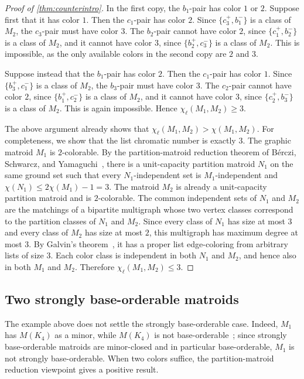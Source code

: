 \documentclass[10pt,a4paper]{article}
\theoremstyle{plain}
\theoremstyle{definition}
\begin{document}
\begin{proof}[Proof of \cref{thm:counterintro}]
In the first copy, the $b_1$-pair has color $1$ or $2$. Suppose first that it has color $1$. Then the $c_1$-pair has color $2$. Since $\{c_3^+,b_1^-\}$ is a class of $M_2$, the $c_3$-pair must have color $3$. The $b_2$-pair cannot have color $2$, since $\{c_1^+,b_2^-\}$ is a class of $M_2$, and it cannot have color $3$, since $\{b_2^+,c_3^-\}$ is a class of $M_2$. This is impossible, as the only available colors in the second copy are $2$ and $3$.

Suppose instead that the $b_1$-pair has color $2$. Then the $c_1$-pair has color $1$. Since $\{b_3^+,c_1^-\}$ is a class of $M_2$, the $b_3$-pair must have color $3$. The $c_2$-pair cannot have color $2$, since $\{b_1^+,c_2^-\}$ is a class of $M_2$, and it cannot have color $3$, since $\{c_2^+,b_3^-\}$ is a class of $M_2$. This is again impossible. Hence $\chi_\ell(M_1,M_2)\ge3$.

The above argument already shows that $\chi_\ell(M_1,M_2)>\chi(M_1,M_2)$. For completeness, we show that the list chromatic number is exactly $3$. The graphic matroid $M_1$ is $2$-colorable. By the partition-matroid reduction theorem of B\'erczi, Schwarcz, and Yamaguchi~\cite[Theorem~1.6]{berczi2021list}, there is a unit-capacity partition matroid $N_1$ on the same ground set such that every $N_1$-independent set is $M_1$-independent and $\chi(N_1)\le2\chi(M_1)-1=3$. The matroid $M_2$ is already a unit-capacity partition matroid and is $2$-colorable. The common independent sets of $N_1$ and $M_2$ are the matchings of a bipartite multigraph whose two vertex classes correspond to the partition classes of $N_1$ and $M_2$. Since every class of $N_1$ has size at most $3$ and every class of $M_2$ has size at most $2$, this multigraph has maximum degree at most $3$. By Galvin's theorem~\cite{galvin1995list}, it has a proper list edge-coloring from arbitrary lists of size $3$. Each color class is independent in both $N_1$ and $M_2$, and hence also in both $M_1$ and $M_2$. Therefore $\chi_\ell(M_1,M_2)\le3$.
\end{proof}


\subsection{Two strongly base-orderable matroids}
\label{sec:sbo}

The example above does not settle the strongly base-orderable case. Indeed, $M_1$ has $M(K_4)$ as a minor, while $M(K_4)$ is not base-orderable~\cite{bonin2016infinite}; since strongly base-orderable matroids are minor-closed and in particular base-orderable, $M_1$ is not strongly base-orderable. When two colors suffice, the partition-matroid reduction viewpoint gives a positive result.
\end{document}
